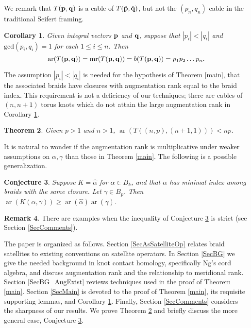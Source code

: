 \documentclass[11pt]{amsart}
\def\ar{\operatorname{ar}}
\def\mr{\operatorname{mr}}
\newtheorem{thm}{Theorem}[section]
\newtheorem{cor}[thm]{Corollary}
\newtheorem{conj}[thm]{Conjecture}
\theoremstyle{definition}
\newtheorem{rem}[thm]{Remark}
\begin{document}
We remark that $T({\bf p},{\bf q})$ is a cable of $T(\hat{\bf p},\hat{\bf q})$, but not the $(p_n,q_n)$-cable in the traditional Seifert framing.

\begin{cor}\label{cor:iteratedCables}
Given integral vectors ${\bf p}$ and ${\bf q}$, suppose that $|p_i|<|q_i|$ and $\text{gcd}(p_i,q_i)=1$ for each $1\le i\le n$. Then 
      \[\ar(T({\bf p},{\bf q}))=\mr(T({\bf p},{\bf q})) = b(T({\bf p},{\bf q}))=p_1p_2\ldots p_n.\]
\end{cor}

The assumption $|p_i|<|q_i|$ is needed for the hypothesis of Theorem \ref{main}, that the associated braids have closures with augmentation rank equal to the braid index. This requirement is not a deficiency of our techniques; there are cables of $(n,n+1)$ torus knots which do not attain the large augmentation rank in Corollary \ref{cor:iteratedCables}.

\begin{thm}\label{ThmNNPlus1}Given $p>1$ and $n>1$, $\ar(T((n,p),(n+1,1))) < np$.
\end{thm}

It is natural to wonder if the augmentation rank is multiplicative under weaker assumptions on $\alpha, \gamma$ than those in Theorem \ref{main}. The following is a possible generalization.

\begin{conj}Suppose $K=\hat{\alpha}$ for $\alpha\in B_k$, and that $\alpha$ has minimal index among braids with the same closure. Let $\gamma\in B_p$. Then $\ar(K(\alpha,\gamma)) \ge \ar(\hat{\alpha})\ar(\hat{\gamma})$.
\label{ConjSuperMultipl}
\end{conj}

\begin{rem}There are examples when the inequality of Conjecture \ref{ConjSuperMultipl} is strict (see Section \ref{SecComments}).
\label{RemStrictlySuper}
\end{rem}

The paper is organized as follows. Section \ref{SecAsSatelliteOp} relates braid satellites to existing conventions on satellite operators. In Section \ref{SecBG} we give the needed background in knot contact homology, specifically Ng's cord algebra, and discuss augmentation rank and the relationship to meridional rank. Section \ref{SecBG_AugExist} reviews techniques used in the proof of Theorem \ref{main}. Section \ref{SecMain} is devoted to the proof of Theorem \ref{main}, its requisite supporting lemmas, and Corollary \ref{cor:iteratedCables}. Finally, Section \ref{SecComments} considers the sharpness of our results. We prove Theorem \ref{ThmNNPlus1} and briefly discuss the more general case, Conjecture \ref{ConjSuperMultipl}.
\end{document}
